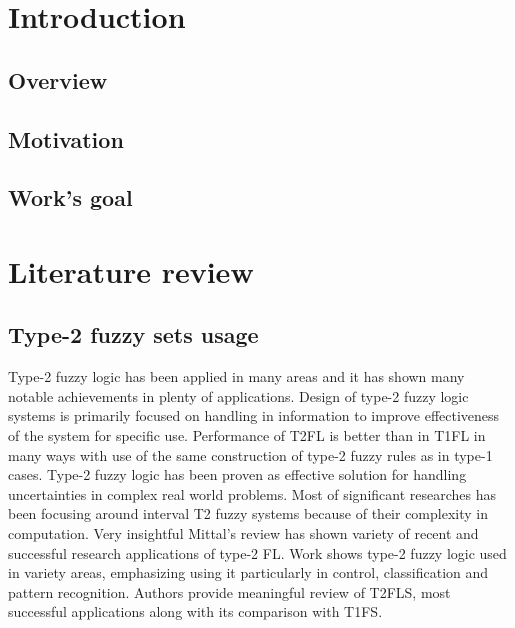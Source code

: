 \documentclass[english,masters]{wizthesis}
\begin{document}
{
\chapter{Introduction}
\section{Overview}

\section{Motivation}

\section{Work's goal}


\chapter{Literature review}
\section{Type-2 fuzzy sets usage}
Type-2 fuzzy logic has been applied in many areas and it has shown many notable achievements in plenty of applications. Design of type-2 fuzzy logic systems is primarily focused on handling in information to improve effectiveness of the system for specific use. Performance of T2FL is better than in T1FL in many ways with use of the same construction of type-2 fuzzy rules as in type-1 cases. Type-2 fuzzy logic has been proven as effective solution for handling uncertainties in complex real world problems. Most of significant researches has been focusing around interval T2 fuzzy systems because of their complexity in computation. Very insightful Mittal's review \cite{MITTAL2020103916} has shown variety of recent and successful research applications of type-2 FL. Work shows type-2 fuzzy logic used in variety areas, emphasizing using it particularly in control, classification and pattern recognition. Authors provide meaningful review of T2FLS, most successful applications along with its comparison with T1FS. 

}
\end{document}
